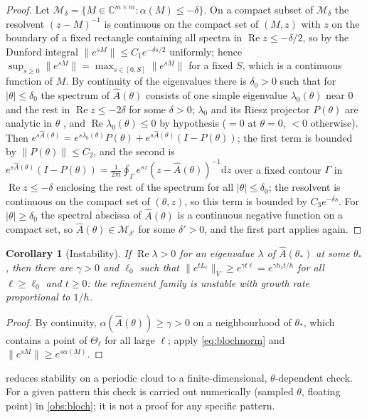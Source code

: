 \documentclass[11pt,a4paper]{article}
\theoremstyle{plain}
\newtheorem{corollary}[theorem]{Corollary}
\theoremstyle{definition}
\theoremstyle{remark}
\numberwithin{equation}{section}
\newcommand{\C}{\mathbb{C}}
\newcommand{\dd}{\mathrm{d}}
\renewcommand{\Re}{\operatorname{Re}}
\newcommand{\ii}{\mathrm{i}}
\begin{document}
\begin{proof}
Let $\mathcal M_\delta=\{M\in\C^{m\times m}:\alpha(M)\le-\delta\}$. On a compact subset of $\mathcal M_\delta$ the resolvent $(z-M)^{-1}$ is continuous on the compact set of $(M,z)$ with $z$ on the boundary of a fixed rectangle containing all spectra in $\Re z\le-\delta/2$, so by the Dunford integral $\|e^{sM}\|\le C_1e^{-\delta s/2}$ uniformly; hence $\sup_{s\ge0}\|e^{sM}\|=\max_{s\in[0,S]}\|e^{sM}\|$ for a fixed $S$, which is a continuous function of $M$. By continuity of the eigenvalues there is $\delta_0>0$ such that for $|\theta|\le\delta_0$ the spectrum of $\hat A(\theta)$ consists of one simple eigenvalue $\lambda_0(\theta)$ near $0$ and the rest in $\Re z\le-2\delta$ for some $\delta>0$; $\lambda_0$ and its Riesz projector $P(\theta)$ are analytic in $\theta$ \cite[Ch.~II]{Kato1995}, and $\Re\lambda_0(\theta)\le0$ by hypothesis ($=0$ at $\theta=0$, $<0$ otherwise). Then $e^{s\hat A(\theta)}=e^{s\lambda_0(\theta)}P(\theta)+e^{s\hat A(\theta)}(I-P(\theta))$; the first term is bounded by $\|P(\theta)\|\le C_2$, and the second is $e^{s\hat A(\theta)}(I-P(\theta))=\frac1{2\pi\ii}\oint_\Gamma e^{sz}(z-\hat A(\theta))^{-1}\dd z$ over a fixed contour $\Gamma$ in $\Re z\le-\delta$ enclosing the rest of the spectrum for all $|\theta|\le\delta_0$; the resolvent is continuous on the compact set of $(\theta,z)$, so this term is bounded by $C_3e^{-\delta s}$. For $|\theta|\ge\delta_0$ the spectral abscissa of $\hat A(\theta)$ is a continuous negative function on a compact set, so $\hat A(\theta)\in\mathcal M_{\delta'}$ for some $\delta'>0$, and the first part applies again.
\end{proof}

\begin{corollary}[Instability]\label{cor:blochunstable}
If $\Re\lambda>0$ for an eigenvalue $\lambda$ of $\hat A(\theta_*)$ at some $\theta_*$, then there are $\gamma>0$ and $\ell_0$ such that $\|e^{tL_\ell}\|_V\ge e^{\gamma t\ell}=e^{\gamma h_1t/h}$ for all $\ell\ge\ell_0$ and $t\ge0$: the refinement family is unstable with growth rate proportional to $1/h$.
\end{corollary}

\begin{proof}
By continuity, $\alpha(\hat A(\theta))\ge\gamma>0$ on a neighbourhood of $\theta_*$, which contains a point of $\Theta_\ell$ for all large $\ell$; apply \eqref{eq:blochnorm} and $\|e^{sM}\|\ge e^{s\alpha(M)}$.
\end{proof}

 reduces stability on a periodic cloud to a finite-dimensional, $\theta$-dependent check. For a given pattern this check is carried out numerically (sampled $\theta$, floating point) in \cref{obs:bloch}; it is not a proof for any specific pattern.
\end{document}
